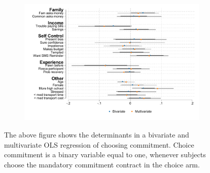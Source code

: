 \begin{appendix}
\begin{figure}[H]
    \caption{Determinants of choice.}
    \begin{center}
    \begin{subfigure}{0.65\textwidth}
        \centering
        \includegraphics[width=\textwidth]{Figuras/determinants_choose_commitment.pdf}
    \end{subfigure}
    \end{center}
\footnotesize{The above figure shows the determinants in a bivariate and multivariate OLS regression of choosing commitment. Choice commitment is a binary variable equal to one, whenever subjects choose the mandatory commitment contract in the choice arm. }
    \label{determinants_choose}
\end{figure}


\end{appendix}
